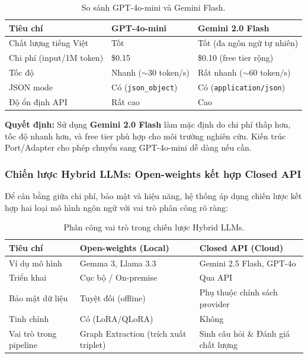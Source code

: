 \begin{table}[H]
    \centering
    \caption{So sánh GPT-4o-mini và Gemini Flash.}
    \label{tab:llm-choice}
    \begin{tabular}{p{4cm}p{5cm}p{5.5cm}}
        \toprule
        \textbf{Tiêu chí} & \textbf{GPT-4o-mini} & \textbf{Gemini 2.0 Flash} \\
        \midrule
        Chất lượng tiếng Việt & Tốt & Tốt (đa ngôn ngữ tự nhiên) \\
        Chi phí (input/1M token) & \$0.15 & \$0.10 (free tier rộng) \\
        Tốc độ                & Nhanh ($\sim$30 token/s) & Rất nhanh ($\sim$60 token/s) \\
        JSON mode             & Có (\texttt{json\_object}) & Có (\texttt{application/json}) \\
        Độ ổn định API        & Rất cao & Cao \\
        \bottomrule
    \end{tabular}
\end{table}

\noindent\textbf{Quyết định:} Sử dụng \textbf{Gemini 2.0 Flash} làm mặc định do
chi phí thấp hơn, tốc độ nhanh hơn, và free tier phù hợp cho môi trường nghiên
cứu. Kiến trúc Port/Adapter cho phép chuyển sang GPT-4o-mini dễ dàng nếu cần.

\subsubsection{Chiến lược Hybrid LLMs: Open-weights kết hợp Closed API}

Để cân bằng giữa chi phí, bảo mật và hiệu năng, hệ thống áp dụng chiến lược
kết hợp hai loại mô hình ngôn ngữ với vai trò phân công rõ ràng:

\begin{table}[H]
    \centering
    \caption{Phân công vai trò trong chiến lược Hybrid LLMs.}
    \label{tab:hybrid-llm}
    \begin{tabular}{p{3.5cm}p{5.5cm}p{5.5cm}}
        \toprule
        \textbf{Tiêu chí} & \textbf{Open-weights (Local)} & \textbf{Closed API (Cloud)} \\
        \midrule
        Ví dụ mô hình      & Gemma 3, Llama 3.3            & Gemini 2.5 Flash, GPT-4o \\
        Triển khai         & Cục bộ / On-premise           & Qua API \\
        Bảo mật dữ liệu    & Tuyệt đối (offline)           & Phụ thuộc chính sách provider \\
        Tinh chỉnh         & Có (LoRA/QLoRA)               & Không \\
        Vai trò trong pipeline & Graph Extraction (trích xuất triplet) & Sinh câu hỏi \& Đánh giá chất lượng \\
        \bottomrule
    \end{tabular}
\end{table}

